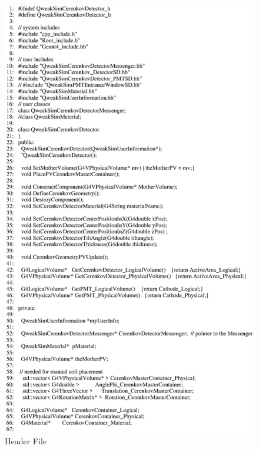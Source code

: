 \begin{figure}[h]
  \hspace{0cm}
  \includegraphics[scale=0.8]{./figures5/QweakSimCerenkovDetector.hh-p1.eps}
  \caption{Header File}
           \label{fig:V-SC-1}
\end{figure}

\clearpage

